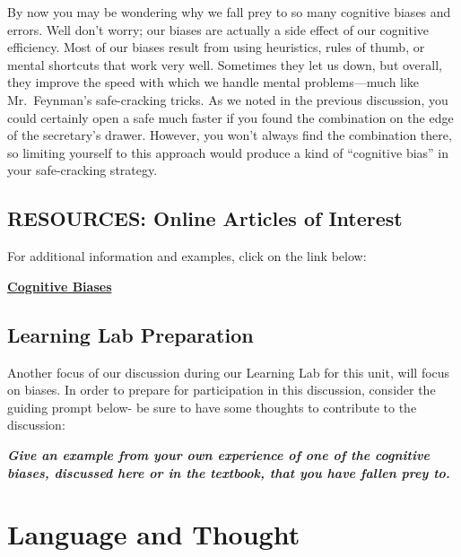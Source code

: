 \documentclass[
]{book}
\begin{document}
By now you may be wondering why we fall prey to so many cognitive biases and errors. Well don't worry; our biases are actually a side effect of our cognitive efficiency. Most of our biases result from using heuristics, rules of thumb, or mental shortcuts that work very well. Sometimes they let us down, but overall, they improve the speed with which we handle mental problems---much like Mr.~Feynman's safe-cracking tricks. As we noted in the previous discussion, you could certainly open a safe much faster if you found the combination on the edge of the secretary's drawer. However, you won't always find the combination there, so limiting yourself to this approach would produce a kind of ``cognitive bias'' in your safe-cracking strategy.

\hypertarget{resources-online-articles-of-interest}{%
\subsection*{RESOURCES: Online Articles of Interest}\label{resources-online-articles-of-interest}}

For additional information and examples, click on the link below:

\href{https://en.wikipedia.org/wiki/List_of_cognitive_biases}{\textbf{Cognitive Biases}}

\hypertarget{learning-lab-preparation}{%
\subsection*{Learning Lab Preparation}\label{learning-lab-preparation}}

Another focus of our discussion during our Learning Lab for this unit, will focus on biases. In order to prepare for participation in this discussion, consider the guiding prompt below- be sure to have some thoughts to contribute to the discussion:

\textbf{\emph{Give an example from your own experience of one of the cognitive biases, discussed here or in the textbook, that you have fallen prey to.}}

\hypertarget{language-and-thought}{%
\section{Language and Thought}\label{language-and-thought}}
\end{document}
